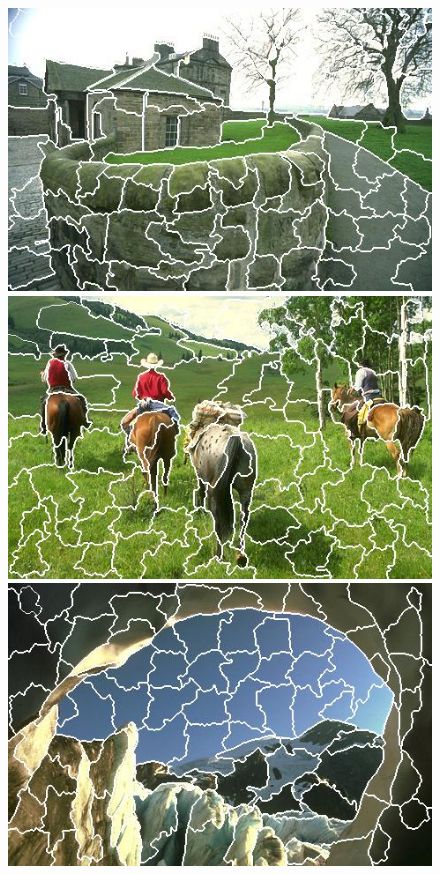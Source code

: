 \begin{figure}[h]
{\begin{minipage}[b]{0.13\linewidth}
\includegraphics[width=1\linewidth]{figures/img/WT/WT_92014.jpg}
\includegraphics[width=1\linewidth]{figures/img/WT/WT_220003.jpg}
\includegraphics[width=1\linewidth]{figures/img/WT/WT_176051.jpg}

\end{minipage}}
\end{figure}
